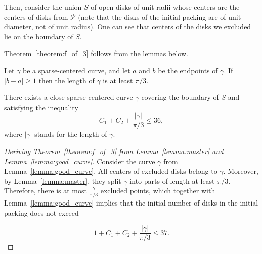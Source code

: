 Then, consider the union $S$ of open disks of unit radii whose centers are the centers of disks from $\mathcal{P}$ (note that the disks of the initial packing are of unit diameter, not of unit radius). One can see that centers of the disks we excluded lie on the boundary of $S$.






Theorem~\ref{theorem:f_of_3} follows from the lemmas below.

\begin{lemma}
Let $\gamma$ be a sparse-centered curve, and let $a$ and $b$ be the endpoints of $\gamma$. If $|b - a|\geq 1$ then the length of $\gamma$ is at least $\pi/3$.
\label{lemma:master}
\end{lemma}

\begin{lemma}
\label{lemma:good_curve}
There exists a close sparse-centered curve $\gamma$ covering the boundary of $S$ and satisfying the inequality
$$C_1 + C_2 + \frac{|\gamma|}{\pi/3} \leq 36,$$
where $|\gamma|$ stands for the length of $\gamma$.
\end{lemma}

\begin{proof}[Deriving Theorem~\ref{theorem:f_of_3} from Lemma~\ref{lemma:master} and Lemma~\ref{lemma:good_curve}]
Consider the curve $\gamma$ from Lemma~\ref{lemma:good_curve}. All centers of excluded disks belong to $\gamma$. Moreover, by Lemma~\ref{lemma:master}, they split $\gamma$ into parts of length at least $\pi/3$. Therefore, there is at most $\frac{|\gamma|}{\pi/3}$ excluded points, which together with Lemma~\ref{lemma:good_curve} implies that the initial number of disks in the initial packing does not exceed

$$1 + C_1 + C_2 + \frac{|\gamma|}{\pi/3} \leq 37.$$
\end{proof}

